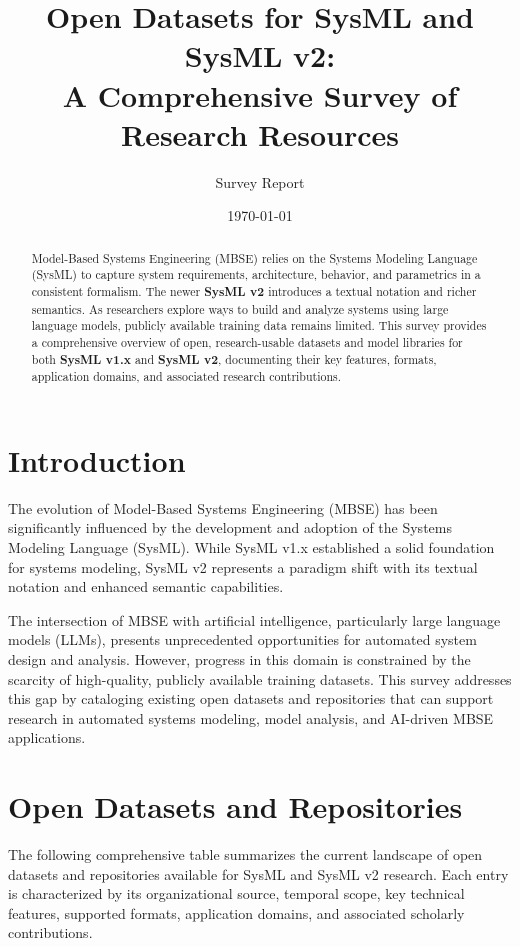 \documentclass[11pt,a4paper]{article}
\title{\textbf{\Large Open Datasets for SysML and SysML v2: \\
\large A Comprehensive Survey of Research Resources}}
\author{Survey Report}
\date{\today}
\begin{document}
\maketitle

\begin{abstract}
Model-Based Systems Engineering (MBSE) relies on the Systems Modeling Language (SysML) to capture system requirements, architecture, behavior, and parametrics in a consistent formalism. The newer \textbf{SysML v2} introduces a textual notation and richer semantics. As researchers explore ways to build and analyze systems using large language models, publicly available training data remains limited. This survey provides a comprehensive overview of open, research-usable datasets and model libraries for both \textbf{SysML v1.x} and \textbf{SysML v2}, documenting their key features, formats, application domains, and associated research contributions.
\end{abstract}

\section{Introduction}

The evolution of Model-Based Systems Engineering (MBSE) has been significantly influenced by the development and adoption of the Systems Modeling Language (SysML). While SysML v1.x established a solid foundation for systems modeling, SysML v2 represents a paradigm shift with its textual notation and enhanced semantic capabilities.

The intersection of MBSE with artificial intelligence, particularly large language models (LLMs), presents unprecedented opportunities for automated system design and analysis. However, progress in this domain is constrained by the scarcity of high-quality, publicly available training datasets. This survey addresses this gap by cataloging existing open datasets and repositories that can support research in automated systems modeling, model analysis, and AI-driven MBSE applications.

\section{Open Datasets and Repositories}

The following comprehensive table summarizes the current landscape of open datasets and repositories available for SysML and SysML v2 research. Each entry is characterized by its organizational source, temporal scope, key technical features, supported formats, application domains, and associated scholarly contributions.
\end{document}
